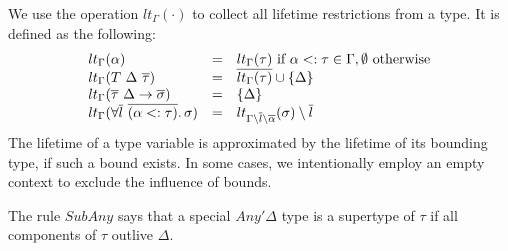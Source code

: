 \documentclass[11pt]{article}
\newcommand{\ap}{~}
\begin{document}
    We use the operation $lt_\Gamma(\cdot)$ to collect all lifetime restrictions from a type.
    It is defined as the following:
    \[
        \begin{array}{lll}
            lt_\Gamma(\alpha)                                     & = & lt_\Gamma(\tau) \text{ if } \alpha <: \tau \in \Gamma, \emptyset \text{ otherwise} \\
            lt_\Gamma(T\ap\Delta\ap\overline{\tau})               & = & \overline{lt_\Gamma(\tau)} \cup \{\Delta\}                                         \\
            lt_\Gamma(\overline{\tau}~\Delta\to\overline{\sigma}) & = & \{\Delta\} \\
            lt_{\Gamma}(\forall \overline{l}~\overline{(\alpha <: \tau)}\ldotp\sigma) & = & lt_{\Gamma\setminus\overline{l}\setminus\overline{\alpha}}(\sigma) \setminus \overline{l} %
        \end{array}
    \]
    The lifetime of a type variable is approximated by the lifetime of its bounding type, if such a bound exists.
    In some cases, we intentionally employ an empty context to exclude the influence of bounds.

    The rule $SubAny$ says that a special $Any'\Delta$ type is a supertype of $\tau$ if all components of $\tau$ outlive $\Delta$.

\end{document}
